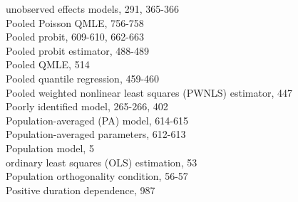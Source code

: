 \documentclass[10pt]{article}
\begin{document}
unobserved effects models, 291, 365-366\\
Pooled Poisson QMLE, 756-758\\
Pooled probit, 609-610, 662-663\\
Pooled probit estimator, 488-489\\
Pooled QMLE, 514\\
Pooled quantile regression, 459-460\\
Pooled weighted nonlinear least squares (PWNLS) estimator, 447\\
Poorly identified model, 265-266, 402\\
Population-averaged (PA) model, 614-615\\
Population-averaged parameters, 612-613\\
Population model, 5\\
ordinary least squares (OLS) estimation, 53\\
Population orthogonality condition, 56-57\\
Positive duration dependence, 987
\end{document}
